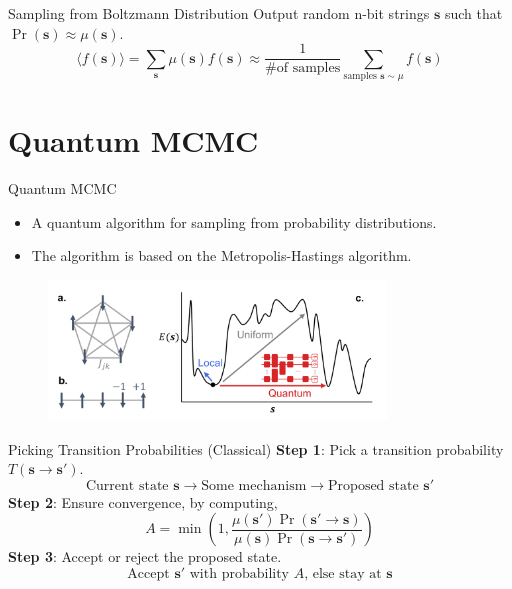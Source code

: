 \documentclass[
    10pt,
    aspectratio=169,
]{beamer}
\begin{document}
\begin{frame}{Sampling from Boltzmann Distribution}
    Output random n-bit strings \(\mathbf{s}\) such that \(\operatorname{Pr}(\mathbf{s})\approx\mu(\mathbf{s})\).
    \[\langle f(\mathbf{s})\rangle=\sum_{\mathbf{s}}\mu(\mathbf{s})f(\mathbf{s})\approx\frac{1}{\text{\# of samples}}\sum_{\text{samples }\mathbf{s}\sim\mu}f(\mathbf{s})\]
\end{frame}

\section{Quantum MCMC}
\begin{frame}{Quantum MCMC}
    \begin{itemize}
        \item A quantum algorithm for sampling from probability distributions.
        \item The algorithm is based on the Metropolis-Hastings algorithm.
    \end{itemize}

    \begin{figure}
        \centering
        \includegraphics[width=0.8\textwidth]{1.png}
    \end{figure}
\end{frame}

\begin{frame}{Picking Transition Probabilities (Classical)}
    \textbf{Step 1}: Pick a transition probability \(T(\mathbf{s}\rightarrow\mathbf{s'})\).
    \[\text{Current state }\mathbf{s}\longrightarrow\text{Some mechanism}\longrightarrow\text{Proposed state }\mathbf{s'}\]
    \textbf{Step 2}: Ensure convergence, by computing,
    \[A=\min\left(1,\frac{\mu(\mathbf{s'})\operatorname{Pr}(\mathbf{s'}\rightarrow\mathbf{s})}{\mu(\mathbf{s})\operatorname{Pr}(\mathbf{s}\rightarrow\mathbf{s'})}\right)\]
    \textbf{Step 3}: Accept or reject the proposed state.
    \[\text{Accept }\mathbf{s'}\text{ with probability }A\text{, else stay at }\mathbf{s}\]
\end{frame}
\end{document}
